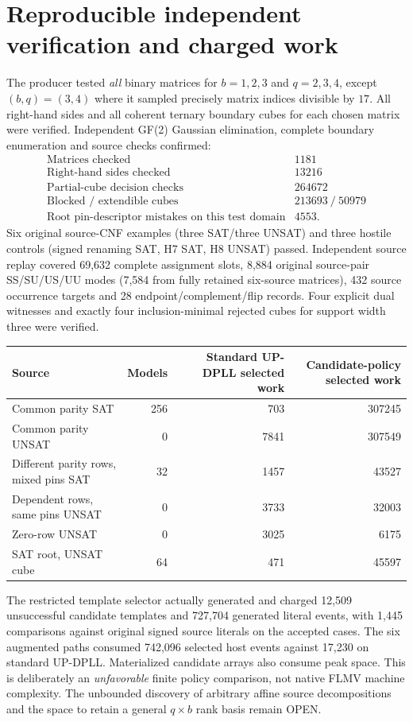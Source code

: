 \documentclass[11pt]{article}
\begin{document}
\section{Reproducible independent verification and charged work}
The producer tested \emph{all} binary matrices for $b=1,2,3$ and $q=2,3,4$, except $(b,q)=(3,4)$ where it sampled precisely matrix indices divisible by $17$. All right-hand sides and all coherent ternary boundary cubes for each chosen matrix were verified. Independent GF(2) Gaussian elimination, complete boundary enumeration and source checks confirmed:
\[
\begin{array}{lr}
\text{Matrices checked}&1181\\
\text{Right-hand sides checked}&13216\\
\text{Partial-cube decision checks}&264672\\
\text{Blocked / extendible cubes}&213693\ /\ 50979\\
\text{Root pin-descriptor mistakes on this test domain}&4553.
\end{array}
\]
Six original source-CNF examples (three SAT/three UNSAT) and three hostile controls (signed renaming SAT, H7 SAT, H8 UNSAT) passed. Independent source replay covered 69,632 complete assignment slots, 8,884 original source-pair SS/SU/US/UU modes (7,584 from fully retained six-source matrices), 432 source occurrence targets and 28 endpoint/complement/flip records. Four explicit dual witnesses and exactly four inclusion-minimal rejected cubes for support width three were verified.

\begin{center}\begin{tabular}{lrrr}
\toprule
Source & Models & Standard UP-DPLL selected work & Candidate-policy selected work\\\midrule
Common parity SAT &256&703&307245\\
Common parity UNSAT &0&7841&307549\\
Different parity rows, mixed pins SAT&32&1457&43527\\
Dependent rows, same pins UNSAT&0&3733&32003\\
Zero-row UNSAT&0&3025&6175\\
SAT root, UNSAT cube&64&471&45597\\
\bottomrule
\end{tabular}\end{center}
The restricted template selector actually generated and charged 12,509 unsuccessful candidate templates and 727,704 generated literal events, with 1,445 comparisons against original signed source literals on the accepted cases. The six augmented paths consumed 742,096 selected host events against 17,230 on standard UP-DPLL. Materialized candidate arrays also consume peak space. This is deliberately an \emph{unfavorable} finite policy comparison, not native FLMV machine complexity. The unbounded discovery of arbitrary affine source decompositions and the space to retain a general $q\times b$ rank basis remain OPEN.
\end{document}
